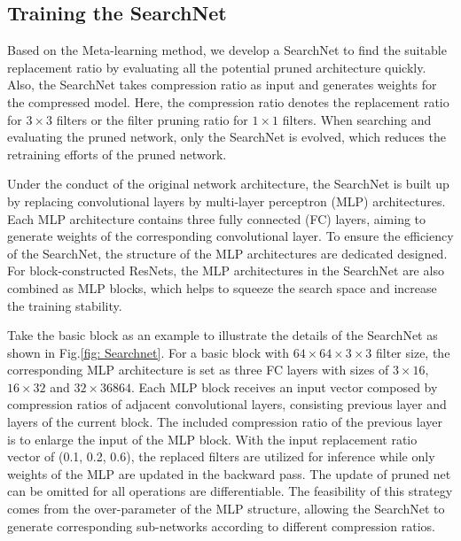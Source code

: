 \documentclass[journal,article,submit,pdftex,moreauthors]{Definitions/mdpi}
\begin{document}
\subsection{Training the SearchNet}
Based on the Meta-learning method, we develop a SearchNet to find the suitable replacement ratio by evaluating all the potential pruned architecture quickly. Also, the SearchNet takes compression ratio as input and generates weights for the compressed model. Here, the compression ratio denotes the replacement ratio for $3\times 3$ filters or the filter pruning ratio for $1\times 1$ filters. When searching and evaluating the pruned network, only the SearchNet is evolved, which reduces the retraining efforts of the pruned network. 

Under the conduct of the original network architecture, the SearchNet is built up by replacing convolutional layers by multi-layer perceptron (MLP) architectures. Each MLP architecture contains three fully connected (FC) layers, aiming to generate weights of the corresponding convolutional layer. To ensure the efficiency of the SearchNet, the structure of the MLP architectures are dedicated designed. For block-constructed ResNets, the MLP architectures in the SearchNet are also combined as MLP blocks, which helps to squeeze the search space and increase the training stability. 
 
Take the basic block as an example to illustrate the details of the SearchNet as shown in Fig.\ref{fig: Searchnet}. For a basic block with $64\times 64\times 3\times 3$ filter size, the corresponding MLP architecture is set as three FC layers with sizes of $3\times 16$, $16\times 32$ and $32\times 36864$. Each MLP block receives an input vector composed by compression ratios of adjacent convolutional layers, consisting previous layer and layers of the current block. The included compression ratio of the previous layer is to enlarge the input of the MLP block. With the input replacement ratio vector of (0.1, 0.2, 0.6), the replaced filters are utilized for inference while only weights of the MLP are updated in the backward pass. The update of pruned net can be omitted for all operations are differentiable. The feasibility of this strategy comes from the over-parameter of the MLP structure, allowing the SearchNet to generate corresponding sub-networks according to different compression ratios.
 
\end{document}
